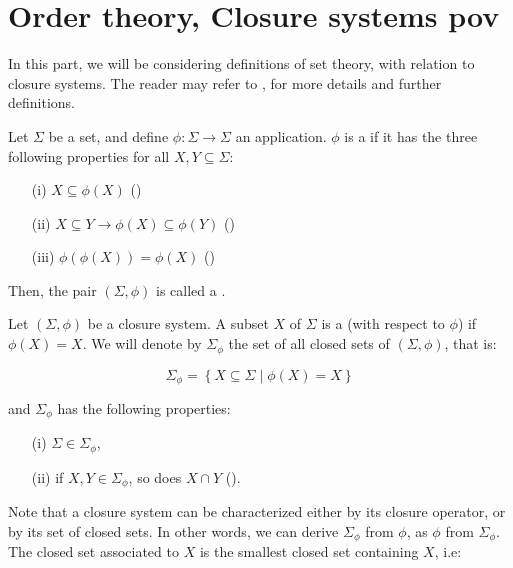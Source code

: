 \section{Order theory, Closure systems pov}

In this part, we will be considering definitions of set theory, with relation to
closure systems. The reader may refer to \cite{CExp}, \cite{Lat&Ord} for more 
details and further definitions.

\begin{definition} Let
$\Sigma$ be a set, and define $\phi : \Sigma \longrightarrow \Sigma$ an
application. $\phi$ is a  if it has the three following
properties for all $X, Y \subseteq \Sigma$:
\begin{itemize}
	\item[(i)] $X \subseteq \phi(X)$ ()
	\item[(ii)] $X \subseteq Y \longrightarrow \phi(X) \subseteq \phi(Y)$ 
		()
	\item[(iii)] $\phi(\phi(X)) = \phi(X)$ ()
\end{itemize}

\noindent Then, the pair $(\Sigma, \phi)$ is called a .
	
\end{definition}


\begin{definition} Let $(\Sigma, \phi)$ be a closure 
system. A subset $X$ of $\Sigma$ is a  (with respect to 
$\phi$) if $\phi(X) = X$. We will denote by $\Sigma_{\phi}$ the set of all 
closed sets of $(\Sigma, \phi)$, that is:
	
	\[ \Sigma_{\phi} = \left\{ X \subseteq \Sigma \; | \; \phi(X) = X 
	\right\}  \]

\noindent and $\Sigma_{\phi}$ has the following properties:
\begin{itemize}
	\item[(i)] $\Sigma \in \Sigma_{\phi}$,
	\item[(ii)] if $X, Y \in \Sigma_{\phi}$, so does $X \cap Y$ 
		().
\end{itemize}
	
\end{definition}

\noindent Note that a closure system can be characterized either by its closure
operator, or by its set of closed sets. In other words, we can derive 
$\Sigma_{\phi}$ from $\phi$, as $\phi$ from $\Sigma_{\phi}$. The closed set 
associated to $X$ is the smallest closed set containing $X$, i.e:

